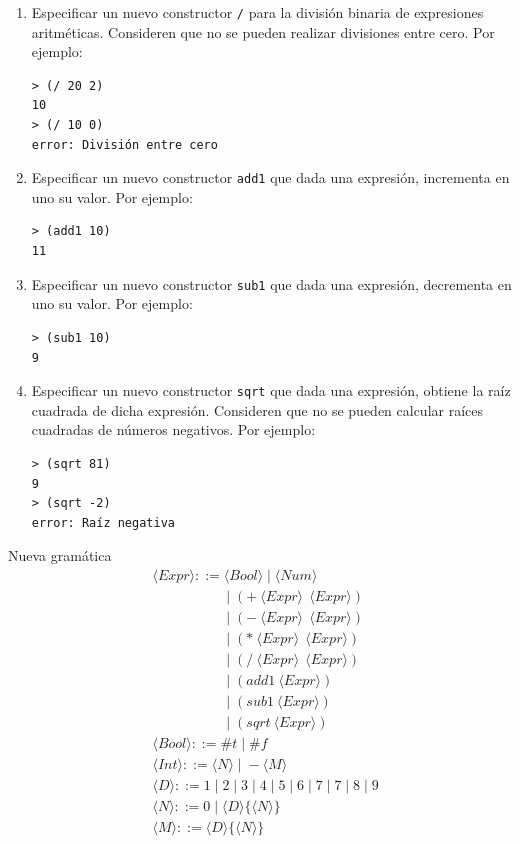 \documentclass{article}
\newcommand{\pr}{::=}
\newcommand{\nt}[1]{\langle #1 \rangle}
\newcommand{\gr}{\;|\;}
\begin{document}
\begin{enumerate}
\begin{enumerate}
        \item Especificar un nuevo constructor \texttt{/} para la división binaria de expresiones aritméticas. Consideren que no se pueden realizar divisiones entre cero. Por ejemplo:
          \begin{verbatim}
> (/ 20 2)
10
> (/ 10 0)
error: División entre cero
          \end{verbatim}

        \item Especificar un nuevo constructor \texttt{add1} que dada una expresión, incrementa en uno su valor. Por ejemplo:
          \begin{verbatim}
> (add1 10)
11
          \end{verbatim}

        \item Especificar un nuevo constructor \texttt{sub1} que dada una expresión, decrementa en uno su valor. Por ejemplo:
          \begin{verbatim}
> (sub1 10)
9
          \end{verbatim}

        \item Especificar un nuevo constructor \texttt{sqrt} que dada una expresión, obtiene la raíz cuadrada de dicha expresión. Consideren que no se pueden calcular raíces cuadradas de números negativos. Por ejemplo:
          \begin{verbatim}
> (sqrt 81)
9
> (sqrt -2)
error: Raíz negativa
          \end{verbatim}
      \end{enumerate}

      Nueva gramática
      \begin{align*}
        &\nt{Expr} \pr \nt{Bool} \gr \nt{Num}\\
        &\qquad\qquad\quad \gr (+\ \nt{Expr}\ \ \nt{Expr})\\
        &\qquad\qquad\quad \gr (-\ \nt{Expr}\ \ \nt{Expr})\\
        &\qquad\qquad\quad \gr (*\ \nt{Expr}\ \ \nt{Expr})\\
        &\qquad\qquad\quad \gr (/\ \nt{Expr}\ \ \nt{Expr})\\
        &\qquad\qquad\quad \gr (add1 \ \nt{Expr})\\
        &\qquad\qquad\quad \gr (sub1 \ \nt{Expr})\\
        &\qquad\qquad\quad \gr (sqrt \ \nt{Expr})\\
        &\nt{Bool} \pr \#t \gr \#f\\
        &\nt{Int} \pr \nt{N} \gr -\nt{M}\\
        &\nt{D} \pr 1 \gr 2 \gr 3 \gr 4 \gr 5 \gr 6 \gr 7 \gr 7 \gr 8 \gr 9\\
        &\nt{N} \pr 0 \gr \nt{D}\{\nt{N}\}\\
        &\nt{M} \pr \nt{D}\{\nt{N}\}
      \end{align*}


\end{enumerate}
\end{document}
